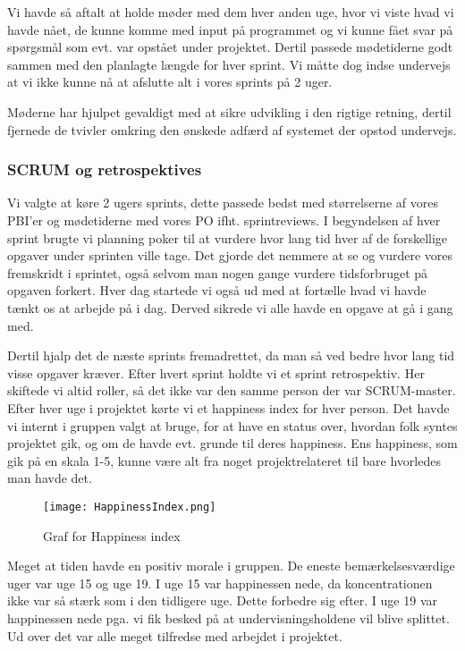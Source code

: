 Vi havde så aftalt at holde møder med dem hver anden uge, hvor vi viste hvad vi havde nået, de kunne komme med input på programmet og vi kunne fået svar på spørgsmål som evt. var opstået under projektet. Dertil passede mødetiderne godt sammen med den planlagte længde for hver sprint. 
Vi måtte dog indse undervejs at vi ikke kunne nå at afslutte alt i vores sprints på 2 uger.

Møderne har hjulpet gevaldigt med at sikre udvikling i den rigtige retning, dertil fjernede de tvivler omkring den ønskede adfærd af systemet der opstod undervejs. 

\subsubsection{SCRUM og retrospektives}

Vi valgte at køre 2 ugers sprints, dette passede bedst med størrelserne af vores PBI'er og mødetiderne med vores PO ifht. sprintreviews.
I begyndelsen af hver sprint brugte vi planning poker til at vurdere hvor lang tid hver af de forskellige opgaver under sprinten ville tage.
Det gjorde det nemmere at se og vurdere vores fremskridt i sprintet, også selvom man nogen gange vurdere tidsforbruget på opgaven forkert.
Hver dag startede vi også ud med at fortælle hvad vi havde tænkt os at arbejde på i dag. Derved sikrede vi alle havde en opgave at gå i gang med.

Dertil hjalp det de næste sprints fremadrettet, da man så ved bedre hvor lang tid visse opgaver kræver.
Efter hvert sprint holdte vi et sprint retrospektiv. Her skiftede vi altid roller, så det ikke var den samme person der var SCRUM-master.
Efter hver uge i projektet kørte vi et happiness index for hver person.
Det havde vi internt i gruppen valgt at bruge, for at have en status over, hvordan folk syntes projektet gik, og om de havde evt. grunde til deres happiness.
Ens happiness, som gik på en skala 1-5, kunne være alt fra noget projektrelateret til bare hvorledes man havde det.

\begin{figure}[h]
    \caption{Graf for Happiness index}
    \centering
        \texttt{[image: HappinessIndex.png]}
    \label{happinessindex}
\end{figure}

Meget at tiden havde en positiv morale i gruppen. De eneste bemærkelsesværdige uger var uge 15 og uge 19.
I uge 15 var happinessen nede, da koncentrationen ikke var så stærk som i den tidligere uge. Dette forbedre sig efter.
I uge 19 var happinessen nede pga. vi fik besked på at undervisningsholdene vil blive splittet. Ud over det var alle meget tilfredse med arbejdet i projektet.


